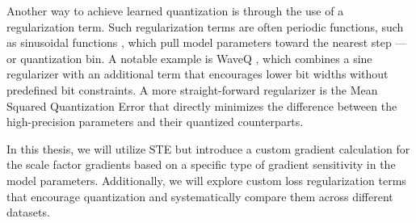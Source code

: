 Another way to achieve learned quantization is through the use of a regularization term. 
Such regularization terms are often periodic functions, 
such as sinusoidal functions \cite{DBLP:journals/corr/abs-1811-09862,DBLP:journals/corr/abs-1905-01416}, 
which pull model parameters toward the nearest step — or quantization bin.
A notable example is WaveQ \cite{DBLP:journals/corr/abs-2003-00146},
which combines a sine regularizer with an additional term that encourages lower bit widths
without predefined bit constraints. A more straight-forward regularizer is
the Mean Squared Quantization Error \cite{DBLP:journals/access/ChoiEL20}
that directly minimizes the difference between the high-precision parameters
and their quantized counterparts.

In this thesis, we will utilize STE but introduce a custom gradient calculation for the scale factor gradients
based on a specific type of gradient sensitivity in the model parameters.
Additionally, we will explore custom loss regularization terms that encourage quantization
and systematically compare them across different datasets.